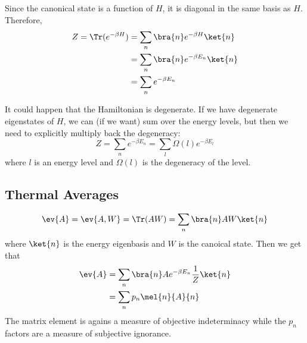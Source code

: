 \documentclass[a4paper,twoside,master.tex]{subfiles}
\begin{document}
Since the canonical state is a function of $ H $, it is diagonal in the same basis as $ H $. Therefore,
\begin{align}
    Z = \Tr(e^{- \beta H}) &= \sum_n\bra{n} e^{- \beta H}\ket{n} \\
    &= \sum_n\bra{n} e^{- \beta E_n}\ket{n} \\
    &= \sum_n e^{- \beta E_n}
\end{align}

It could happen that the Hamiltonian is degenerate. If we have degenerate eigenstates of $ H $, we can (if we want) sum over the energy levels, but then we need to explicitly multiply back the degeneracy:
\begin{equation}
    Z = \sum_n e^{- \beta E_n} = \sum_l \Omega(l) e^{- \beta E_l}
\end{equation}
where $ l $ is an energy level and $ \Omega(l) $ is the degeneracy of the level.

\subsection{Thermal Averages}
\label{sub:thermal_averages}

\begin{equation}
    \ev{A} = \ev{A,W} = \Tr(AW) = \sum_n\bra{n} AW\ket{n}
\end{equation}
where $\ket{n} $ is the energy eigenbasis and $ W $ is the canoical state. Then we get that
\begin{align}
    \ev{A} &= \sum_n\bra{n} A e^{- \beta E_n} \frac{1}{Z}\ket{n} \\
    &= \sum_n p_n \mel{n}{A}{n}
\end{align}
The matrix element is agains a measure of objective indeterminacy while the $ p_n $ factors are a measure of subjective ignorance.
\end{document}
